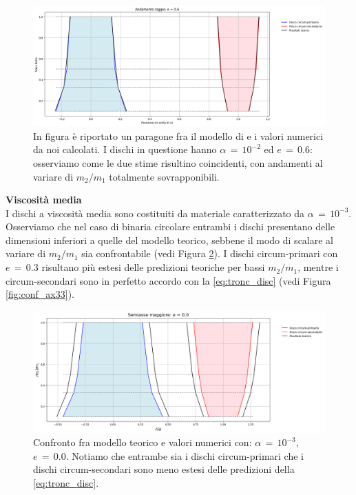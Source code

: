 \begin{figure}[H]
  \centering
  \includegraphics[width=\textwidth]{Immagini/Confronto/confax_A2_e6.png}
  \caption{In figura è riportato un paragone fra il modello di \textcite{ManaraTronc2019} e i valori numerici da noi calcolati. I dischi in questione hanno $\alpha\,=\,10^{-2}$ ed $e\,=\,0.6$: osserviamo come le due stime risultino coincidenti, con andamenti al variare di $m_2/m_1$ totalmente sovrapponibili.}
  \label{fig:conf_ax26}
\end{figure}

\textbf{Viscosità media}\\

I dischi a viscosità media sono costituiti da materiale caratterizzato da $\alpha\,=\,10^{-3}$. 
Osserviamo che nel caso di binaria circolare entrambi i dischi presentano delle dimensioni inferiori a quelle del modello teorico, sebbene il modo di scalare al variare di $m_2/m_1$ sia confrontabile (vedi Figura \ref{fig:conf_ax30}).
I dischi circum-primari con $e\,=\,0.3$ risultano più estesi delle predizioni teoriche per bassi $m_2/m_1$, mentre i circum-secondari sono in perfetto accordo con la \ref{eq:tronc_disc} (vedi Figura \ref{fig:conf_ax33}).

\begin{figure}[H]
  \centering
  \includegraphics[width=\textwidth]{Immagini/Confronto/confax_A3_e0.png}
  \caption{Confronto fra modello teorico e valori numerici con: $\alpha\,=\,10^{-3}$, $e\,=\,0.0$. Notiamo che entrambe sia i dischi circum-primari che i dischi circum-secondari sono meno estesi delle predizioni della \ref{eq:tronc_disc}.}
  \label{fig:conf_ax30}
\end{figure}

